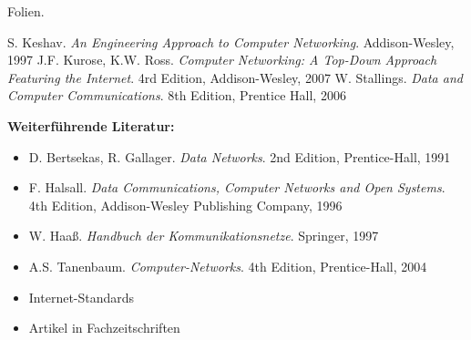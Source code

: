 \begin{course}
\begin{content}
\end{content}

\begin{media}Folien.

\end{media}

\begin{literature}S. Keshav. \emph{An Engineering Approach to Computer Networking}. Addison-Wesley, 1997\newline
\newline
J.F. Kurose, K.W. Ross. \emph{Computer Networking: A Top-Down Approach Featuring the Internet}. 4rd Edition, Addison-Wesley, 2007\newline
\newline
W. Stallings. \emph{Data and Computer Communications}. 8th Edition, Prentice Hall, 2006

 

\textbf{Weiterführende Literatur:}

 \begin{itemize}\item D. Bertsekas, R. Gallager. \emph{Data Networks}. 2nd Edition, Prentice-Hall, 1991  \item F. Halsall. \emph{Data Communications, Computer Networks and Open Systems}. 4th Edition, Addison-Wesley Publishing Company, 1996  \item W. Haaß. \emph{Handbuch der Kommunikationsnetze}. Springer, 1997  \item A.S. Tanenbaum. \emph{Computer-Networks}. 4th Edition, Prentice-Hall, 2004  \item Internet-Standards  \item Artikel in Fachzeitschriften  \end{itemize}\end{literature}



\end{course}